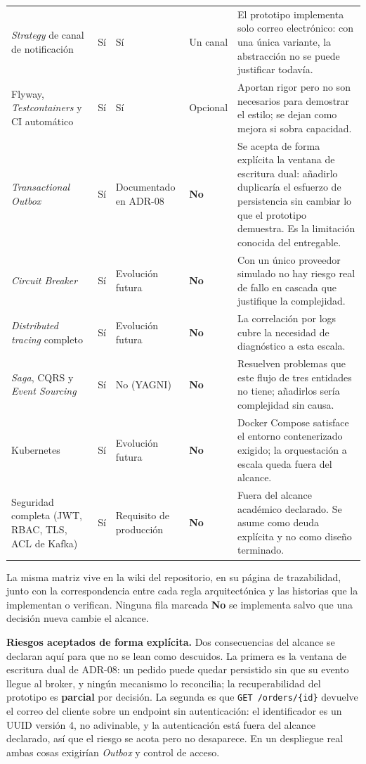 \documentclass[12pt,a4paper]{article}
\begin{document}
\begin{longtable}{P{0.26\textwidth} P{0.08\textwidth} P{0.13\textwidth} P{0.12\textwidth} P{0.29\textwidth}}
\textit{Strategy} de canal de notificación & Sí & Sí & Un canal & El prototipo implementa solo correo electrónico: con una única variante, la abstracción no se puede justificar todavía. \\
Flyway, \textit{Testcontainers} y CI automático & Sí & Sí & Opcional & Aportan rigor pero no son necesarios para demostrar el estilo; se dejan como mejora si sobra capacidad. \\
\textit{Transactional Outbox} & Sí & Documentado en ADR-08 & \textbf{No} & Se acepta de forma explícita la ventana de escritura dual: añadirlo duplicaría el esfuerzo de persistencia sin cambiar lo que el prototipo demuestra. Es la limitación conocida del entregable. \\
\textit{Circuit Breaker} & Sí & Evolución futura & \textbf{No} & Con un único proveedor simulado no hay riesgo real de fallo en cascada que justifique la complejidad. \\
\textit{Distributed tracing} completo & Sí & Evolución futura & \textbf{No} & La correlación por logs cubre la necesidad de diagnóstico a esta escala. \\
\textit{Saga}, CQRS y \textit{Event Sourcing} & Sí & No (YAGNI) & \textbf{No} & Resuelven problemas que este flujo de tres entidades no tiene; añadirlos sería complejidad sin causa. \\
Kubernetes & Sí & Evolución futura & \textbf{No} & Docker Compose satisface el entorno contenerizado exigido; la orquestación a escala queda fuera del alcance. \\
Seguridad completa (JWT, RBAC, TLS, ACL de Kafka) & Sí & Requisito de producción & \textbf{No} & Fuera del alcance académico declarado. Se asume como deuda explícita y no como diseño terminado. \\
\bottomrule
\end{longtable}
\setlength{\tabcolsep}{6pt}
\normalsize

La misma matriz vive en la wiki del repositorio, en su página de trazabilidad, junto con la correspondencia entre cada regla arquitectónica y las historias que la implementan o verifican. Ninguna fila marcada \textbf{No} se implementa salvo que una decisión nueva cambie el alcance.

\textbf{Riesgos aceptados de forma explícita.} Dos consecuencias del alcance se declaran aquí para que no se lean como descuidos. La primera es la ventana de escritura dual de ADR-08: un pedido puede quedar persistido sin que su evento llegue al broker, y ningún mecanismo lo reconcilia; la recuperabilidad del prototipo es \textbf{parcial} por decisión. La segunda es que \texttt{GET /orders/\{id\}} devuelve el correo del cliente sobre un endpoint sin autenticación: el identificador es un UUID versión 4, no adivinable, y la autenticación está fuera del alcance declarado, así que el riesgo se acota pero no desaparece. En un despliegue real ambas cosas exigirían \textit{Outbox} y control de acceso.
\end{document}

